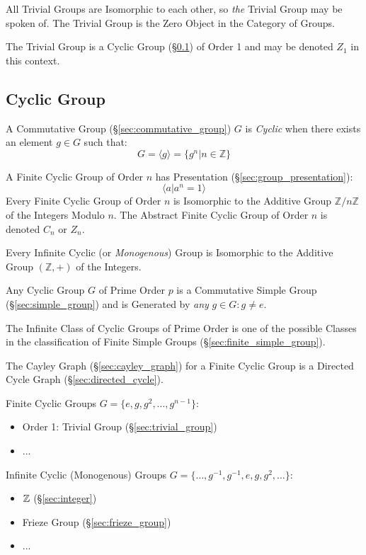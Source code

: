 All Trivial Groups are Isomorphic to each other, so \emph{the} Trivial Group may
be spoken of. The Trivial Group is the Zero Object in the Category of Groups.

The Trivial Group is a Cyclic Group (\S\ref{sec:cyclic_group}) of Order 1 and
may be denoted $Z_1$ in this context.



\subsection{Cyclic Group}\label{sec:cyclic_group}

A Commutative Group (\S\ref{sec:commutative_group}) $G$ is \emph{Cyclic} when
there exists an element $g \in G$ such that:
\[
    G = \langle{g}\rangle = \{ g^n | n \in \mathbb{Z} \}
\]

A Finite Cyclic Group of Order $n$ has Presentation
(\S\ref{sec:group_presentation}):
\[
  \langle{a | a^n = 1}\rangle
\]
Every Finite Cyclic Group of Order $n$ is Isomorphic to the Additive Group
$\mathbb{Z}/n\mathbb{Z}$ of the Integers Modulo $n$. The Abstract Finite Cyclic
Group of Order $n$ is denoted $C_n$ or $Z_n$.

Every Infinite Cyclic (or \emph{Monogenous}) Group is Isomorphic to the Additive
Group $(\mathbb{Z}, +)$ of the Integers.

Any Cyclic Group $G$ of Prime Order $p$ is a Commutative Simple Group
(\S\ref{sec:simple_group}) and is Generated by \emph{any} $g \in G : g \neq e$.

The Infinite Class of Cyclic Groups of Prime Order is one of the possible
Classes in the classification of Finite Simple Groups
(\S\ref{sec:finite_simple_group}).

The Cayley Graph (\S\ref{sec:cayley_graph}) for a Finite Cyclic Group is a
Directed Cycle Graph (\S\ref{sec:directed_cycle}).

Finite Cyclic Groups $G = \{ e, g, g^2, \ldots, g^{n-1} \}$:
\begin{itemize}
  \item Order 1: Trivial Group (\S\ref{sec:trivial_group})
  \item ...
\end{itemize}

Infinite Cyclic (Monogenous) Groups
$G = \{ \ldots, g^{-1}, g^{-1}, e, g, g^2, \ldots \}$:
\begin{itemize}
  \item $\mathbb{Z}$ (\S\ref{sec:integer})
  \item Frieze Group (\S\ref{sec:frieze_group})
  \item ...
\end{itemize}



